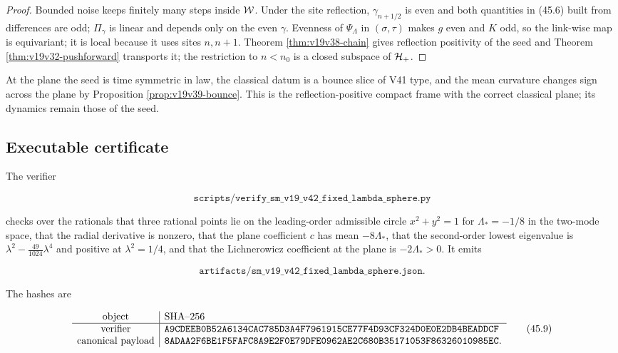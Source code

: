 \documentclass[11pt]{article}
\theoremstyle{remark}
\begin{document}
\begin{proof}
Bounded noise keeps finitely many steps inside \({\cal W}\).  Under the
site reflection, \(\gamma_{n+1/2}\) is even and both quantities in
(45.6) built from differences are odd; \(\Pi_\gamma\) is linear and
depends only on the even \(\gamma\).  Evenness of \(\Psi_\Lambda\) in
\((\sigma,\tau)\) makes \(g\) even and \(K\) odd, so the link-wise map
is equivariant; it is local because it uses sites \(n,n+1\).  Theorem
\ref{thm:v19v38-chain} gives reflection positivity of the seed and
Theorem \ref{thm:v19v32-pushforward} transports it; the restriction to
\(n<n_0\) is a closed subspace of \({\cal H}_+\).
\end{proof}

At the plane the seed is time symmetric in law, the classical datum is
a bounce slice of V41 type, and the mean curvature changes sign across
the plane by Proposition \ref{prop:v19v39-bounce}.  This is the
reflection-positive compact frame with the correct classical plane; its
dynamics remain those of the seed.

\subsection{Executable certificate}

The verifier

\[
 \texttt{scripts/verify\_sm\_v19\_v42\_fixed\_lambda\_sphere.py}      \tag{45.7}
\]

checks over the rationals that three rational points lie on the
leading-order admissible circle \(x^2+y^2=1\) for \(\Lambda_*=-1/8\) in
the two-mode space, that the radial derivative is nonzero, that the
plane coefficient \(c\) has mean \(-8\Lambda_*\), that the second-order
lowest eigenvalue is \(\lambda^2-\tfrac{49}{1024}\lambda^4\) and
positive at \(\lambda^2=1/4\), and that the Lichnerowicz coefficient
at the plane is \(-2\Lambda_*>0\).  It emits

\[
 \texttt{artifacts/sm\_v19\_v42\_fixed\_lambda\_sphere.json}.        \tag{45.8}
\]

The hashes are

\[
\begin{array}{c|l}
\hbox{object}&\hbox{SHA--256}\\ \hline
\hbox{verifier}&
\texttt{A9CDEEB0B52A6134CAC785D3A4F7961915CE77F4D93CF324D0E0E2DB4BEADDCF}\\
\hbox{canonical payload}&
\texttt{8ADAA2F6BE1F5FAFC8A9E2F0E79DFE0962AE2C680B35171053F86326010985EC}.
\end{array}                                                     \tag{45.9}
\]
\end{document}

